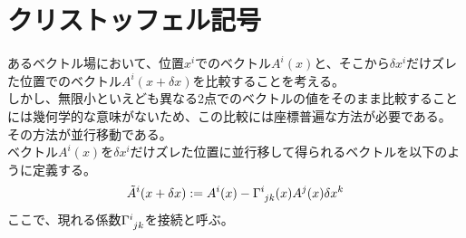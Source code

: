 \documentclass[dvipdfmx]{report} %
\begin{document}
\section{
    クリストッフェル記号
}
あるベクトル場において、位置$x^i$でのベクトル$A^{i}(x)$と、そこから$\delta x^i$だけズレた位置でのベクトル$A^{i}(x+\delta x)$を比較することを考える。\\
しかし、無限小といえども異なる2点でのベクトルの値をそのまま比較することには幾何学的な意味がないため、この比較には座標普遍な方法が必要である。\\
その方法が並行移動である。\\
ベクトル$A^{i}(x)$を$\delta x^i$だけズレた位置に並行移して得られるベクトルを以下のように定義する。
$$
\tilde{A}^{i} (x+\delta x) := A^{i}(x) - \tensor{\Gamma}{^i_{jk}}(x) A^{j}(x) \delta x^{k}
$$
ここで、現れる係数$\tensor{\Gamma}{^i_{jk}}$を接続と呼ぶ。
\end{document}

